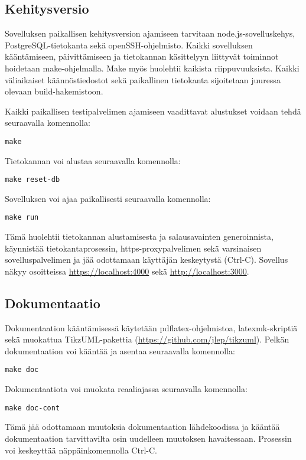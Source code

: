 \documentclass[a4paper,parskip=half]{scrartcl}
\begin{document}
\subsection{Kehitysversio}

Sovelluksen paikallisen kehitysversion ajamiseen tarvitaan
node.js-sovelluskehys, PostgreSQL-tietokanta sekä openSSH-ohjelmisto. Kaikki
sovelluksen kääntämiseen, päivittämiseen ja tietokannan käsittelyyn
liittyvät toiminnot hoidetaan make-ohjelmalla. Make myös huolehtii kaikista
riippuvuuksista. Kaikki väliaikaiset käännöstiedostot sekä
paikallinen tietokanta sijoitetaan juuressa olevaan build-hakemistoon.

Kaikki paikallisen testipalvelimen ajamiseen vaadittavat alustukset voidaan
tehdä seuraavalla komennolla:
\begin{Verbatim}
make
\end{Verbatim}

Tietokannan voi alustaa seuraavalla komennolla:
\begin{Verbatim}
make reset-db
\end{Verbatim}

Sovelluksen voi ajaa paikallisesti seuraavalla komennolla:
\begin{Verbatim}
make run
\end{Verbatim}
Tämä huolehtii tietokannan alustamisesta ja salausavainten generoinnista,
käynnistää tietokantaprosessin, https-proxypalvelimen sekä varsinaisen
sovelluspalvelimen ja jää odottamaan käyttäjän keskeytystä (Ctrl-C).
Sovellus näkyy osoitteissa \url{https://localhost:4000} sekä
\url{http://localhost:3000}.

\subsection{Dokumentaatio}
Dokumentaation kääntämisessä käytetään pdflatex-ohjelmistoa, latexmk-skriptiä
sekä muokattua TikzUML-pakettia (\url{https://github.com/jlep/tikzuml}).
Pelkän dokumentaation voi kääntää ja asentaa seuraavalla komennolla:
\begin{Verbatim}
make doc
\end{Verbatim}

Dokumentaatiota voi muokata reaaliajassa seuraavalla komennolla:
\begin{Verbatim}
make doc-cont
\end{Verbatim}
Tämä jää odottamaan muutoksia dokumentaation lähdekoodissa ja kääntää
dokumentaation tarvittavilta osin uudelleen muutoksen havaitessaan. Prosessin
voi keskeyttää näppäinkomennolla Ctrl-C.
\end{document}
